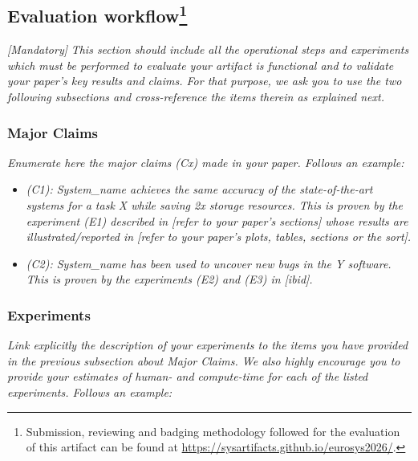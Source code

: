 \subsection{Evaluation workflow\footnote{
Submission, reviewing and badging methodology followed for the evaluation of this artifact can be found at \url{https://sysartifacts.github.io/eurosys2026/}.}}
{\em [Mandatory]} \textit{This section should include all the operational steps and experiments which must be performed to evaluate your artifact is functional and to validate your paper's key results and claims. For that purpose, we ask you to use the two following subsections and cross-reference the items therein as explained next.}

\subsubsection{Major Claims}
\textit{Enumerate here the major claims (Cx) made in your paper. Follows an example:}\\

\begin{itemize}
    \item \textit{(C1): System\_name achieves the same accuracy of the state-of-the-art systems for a task X while saving 2x storage resources. This is proven by the experiment (E1) described in [refer to your paper's sections] whose results are illustrated/reported in [refer to your paper's plots, tables, sections or the sort].}
    \item \textit{(C2): System\_name has been used to uncover new bugs in the Y software. This is proven by the experiments (E2) and (E3) in [ibid].}
\end{itemize}

\subsubsection{Experiments}
\textit{Link explicitly the description of your experiments to the items you have provided in the previous subsection about Major Claims. We also highly encourage you to provide your estimates of human- and compute-time for each of the listed experiments. Follows an example:}
~\\

